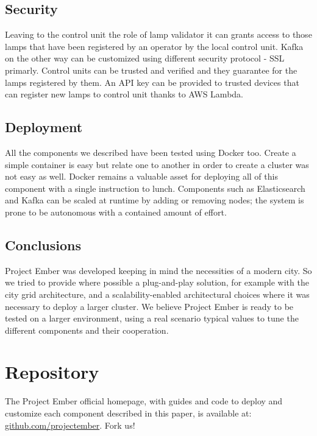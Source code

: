 \subsection{Security}
Leaving to the control unit the role of lamp validator it can grants access to those lamps that have been registered by an operator by the local control unit. Kafka on the other way can be customized using different security protocol - SSL primarly. Control units can be trusted and verified and they guarantee for the lamps registered by them. An API key can be provided to trusted devices that can register new lamps to control unit thanks to AWS Lambda. 

\subsection{Deployment}
All the components we described have been tested using Docker too. Create a simple container is easy but relate one to another in order to create a cluster was not easy as well. Docker remains a valuable asset for deploying all of this component with a single instruction to lunch. Components such as Elasticsearch and Kafka can be scaled at runtime by adding or removing nodes; the system is prone to be autonomous with a contained amount of effort.

\subsection{Conclusions}
Project Ember was developed keeping in mind the necessities of a modern city. So we tried to provide where possible a plug-and-play solution, for example with the city grid architecture, and a scalability-enabled architectural choices where it was necessary to deploy a larger cluster. We believe Project Ember is ready to be tested on a larger environment, using a real scenario typical values to tune the different components and their cooperation. 

\section*{Repository}
The Project Ember official homepage, with guides and code to deploy and customize each component described in this paper, is available at: \href{https://github.com/projectember}{github.com/projectember}. Fork us!

